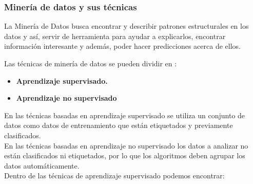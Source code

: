 \subsubsection{Minería de datos y sus técnicas}

La Minería de Datos busca encontrar y describir patrones estructurales en los datos y así, servir de herramienta para ayudar a explicarlos, encontrar información interesante  y además, poder hacer predicciones acerca de ellos.

Las técnicas de minería de datos se pueden dividir en : 
\begin{itemize}
	\item \textbf{Aprendizaje supervisado.}
	\item \textbf{Aprendizaje no supervisado}
\end{itemize}
En las técnicas basadas en aprendizaje supervisado se utiliza un conjunto de datos como datos de entrenamiento que están etiquetados y previamente clasificados.\\

En las técnicas basadas en aprendizaje no supervisado los datos a analizar no están clasificados ni etiquetados, por
lo que los algoritmos deben agrupar los datos automáticamente.\\
Dentro de las técnicas de aprendizaje supervisado podemos encontrar:

